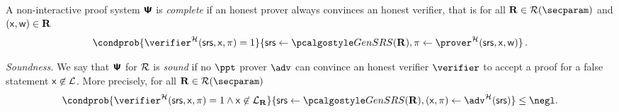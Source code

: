 \documentclass[10pt]{llncs}
\newcommand{\ourpar}[1] {\smallskip\noindent\emph{#1}}
\begin{document}
  A non-interactive proof system $\bm{\mathsf{\Psi}}$ is
  \emph{complete} if an honest prover always convinces an honest verifier, that
  is for all $\REL \in \RELGEN(\secparam)$ and $(\mathsf{x}, \mathsf{w}) \in \mathbf{R}$
	\[
		\condprob{\verifier^\ro (\srs, \inp, \zkproof) = 1} {\srs \gets \kgen(\REL),
      \zkproof \gets \prover^\ro (\srs, \inp, \wit)}\,.
	\]

\ourpar{Soundness.}
    We say that $\bm{\mathsf{\Psi}}$ for $\mathcal{R}$ is \emph{sound} if no
  $\ppt$ prover $\adv$ can convince an honest verifier $\verifier$ to accept a
  proof for a false statement $\mathsf{x} \not\in\mathcal{L}$. More precisely, for
  all $\REL \in \RELGEN(\secparam)$
	\[
    \condprob{ \verifier^\ro (\srs, \inp, \zkproof) = 1 \land \inp \not\in
      \LANG_\REL}{\srs \gets \kgen(\REL), (\inp, \zkproof) \gets \adv^\ro(\srs)} \leq
    \negl.
	\]

\fi
 
\end{document}
